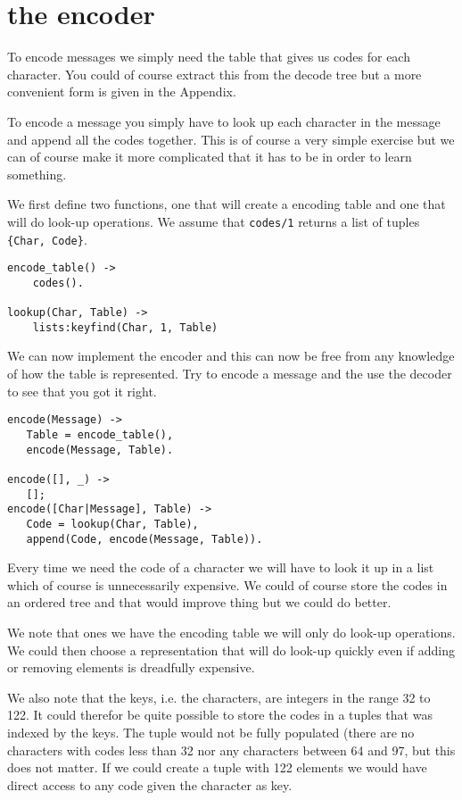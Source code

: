 \documentclass[a4paper,11pt]{article}
\begin{document}
\section{the encoder}

To encode messages we simply need the table that gives us codes for
each character. You could of course extract this from the decode tree
but a more convenient form is given in the Appendix. 

To encode a message you simply have to look up each character in the
message and append all the codes together. This is of course a very
simple exercise but we can of course make it more complicated that it
has to be in order to learn something.

We first define two functions, one that will create a encoding table
and one that will do look-up operations. We assume that {\tt codes/1}
returns a list of tuples {\tt\{Char, Code\}}.

\begin{verbatim}
encode_table() -> 
    codes().

lookup(Char, Table) -> 
    lists:keyfind(Char, 1, Table)
\end{verbatim}


We can now implement the encoder and this can now be free from any
knowledge of how the table is represented. Try to encode a message and
the use the decoder to see that you got it right.

\begin{verbatim}
encode(Message) -> 
   Table = encode_table(),
   encode(Message, Table).

encode([], _) -> 
   [];
encode([Char|Message], Table) -> 
   Code = lookup(Char, Table),
   append(Code, encode(Message, Table)).
\end{verbatim}

Every time we need the code of a character we will have
to look it up in a list which of course is unnecessarily expensive.  We
could of course store the codes in an ordered tree and that would
improve thing but we could do better.

We note that ones we have the encoding table we will only do look-up
operations. We could then choose a representation that will do look-up
quickly even if adding or removing elements is dreadfully expensive.

We also note that the keys, i.e. the characters, are integers in the
range 32 to 122. It could therefor be quite possible to store the
codes in a tuples that was indexed by the keys. The tuple would not be
fully populated (there are no characters with codes less than 32 nor
any characters between 64 and 97, but this does not matter. If we
could create a tuple with 122 elements we would have direct access to
any code given the character as key.
\end{document}
